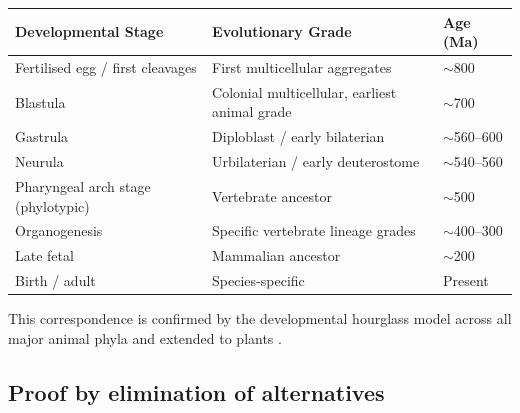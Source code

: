 \documentclass[12pt, a4paper]{article}
\theoremstyle{definition}
\theoremstyle{remark}
\begin{document}
\begin{center}
\begin{tabular}{p{4.5cm}p{4.5cm}p{2.5cm}}
\toprule
\textbf{Developmental Stage} &
\textbf{Evolutionary Grade} &
\textbf{Age (Ma)} \\
\midrule
Fertilised egg / first cleavages
  & First multicellular aggregates & $\sim$800 \\
Blastula
  & Colonial multicellular, earliest animal grade & $\sim$700 \\
Gastrula
  & Diploblast / early bilaterian & $\sim$560--600 \\
Neurula
  & Urbilaterian / early deuterostome & $\sim$540--560 \\
Pharyngeal arch stage (phylotypic)
  & Vertebrate ancestor & $\sim$500 \\
Organogenesis
  & Specific vertebrate lineage grades & $\sim$400--300 \\
Late fetal
  & Mammalian ancestor & $\sim$200 \\
Birth / adult
  & Species-specific & Present \\
\bottomrule
\end{tabular}
\end{center}

\noindent This correspondence is confirmed by the
developmental hourglass model across all major animal phyla
\cite{kalinka2010, irie2011} and extended to plants
\cite{plant_hourglass2024}.

\subsection{Proof by elimination of alternatives}
\end{document}
